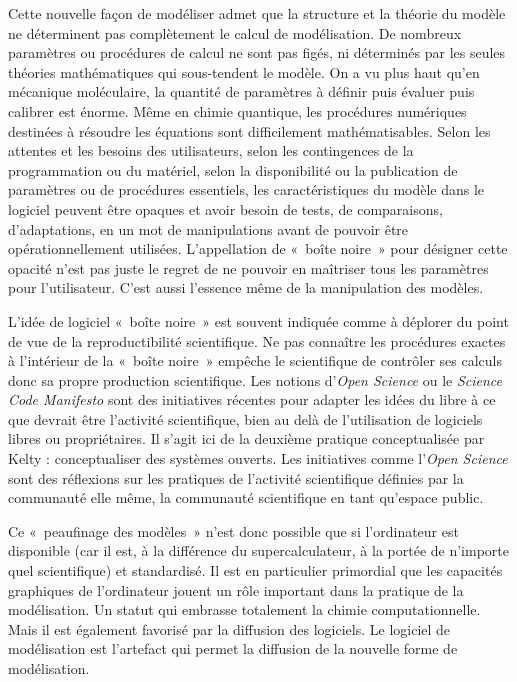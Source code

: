 \documentclass{FramateX}
\begin{document}
\begin{refsection}
Cette nouvelle façon de modéliser admet que la structure et la théorie
du modèle ne déterminent pas complètement le calcul de modélisation. De
nombreux paramètres ou procédures de calcul ne sont pas figés, ni
déterminés par les seules théories mathématiques qui sous-tendent le
modèle. On a vu plus haut qu'en mécanique moléculaire,
la quantité de paramètres à définir puis évaluer puis calibrer est
énorme. Même en chimie quantique, les procédures numériques destinées à
résoudre les équations sont difficilement mathématisables. Selon les
attentes et les besoins des utilisateurs, selon les contingences de la
programmation ou du matériel, selon la disponibilité ou la publication
de paramètres ou de procédures essentiels, les caractéristiques du
modèle dans le logiciel peuvent être opaques et avoir besoin de tests,
de comparaisons, d'adaptations, en un mot de
manipulations avant de pouvoir être opérationnellement utilisées.
L'appellation de «~boîte noire~» pour désigner cette
opacité n'est pas juste le regret de ne pouvoir en
maîtriser tous les paramètres pour l'utilisateur.
C'est aussi l'essence même de la
manipulation des modèles.


L'idée de logiciel «~boîte noire~» est souvent
indiquée comme à déplorer du point de vue de la reproductibilité
scientifique. Ne pas connaître les procédures exactes à
l'intérieur de la «~boîte noire~» empêche le
scientifique de contrôler ses calculs donc sa propre production
scientifique. Les notions d'\textit{Open Science}
ou le \textit{Science Code Manifesto} sont des initiatives récentes
pour adapter les idées du libre à ce que devrait être
l'activité scientifique, bien au delà de
l'utilisation de logiciels libres ou propriétaires. Il
s'agit ici de la deuxième pratique conceptualisée par
Kelty : conceptualiser des systèmes ouverts. Les initiatives comme
l'\textit{Open Science} sont des réflexions sur
les pratiques de l'activité scientifique définies par
la communauté elle même, la communauté scientifique en tant
qu'espace public.

Ce «~peaufinage des modèles~» n'est donc possible que
si l'ordinateur est disponible (car il est, à la
différence du supercalculateur, à la portée de
n'importe quel scientifique) et standardisé. Il est en
particulier primordial que les capacités graphiques de
l'ordinateur jouent un rôle important dans la pratique
de la modélisation. Un statut qui embrasse totalement la chimie
computationnelle. Mais il est également favorisé par la diffusion des
logiciels. Le logiciel de modélisation est l'artefact
qui permet la diffusion de la nouvelle forme de modélisation.


\end{refsection}
\end{document}
